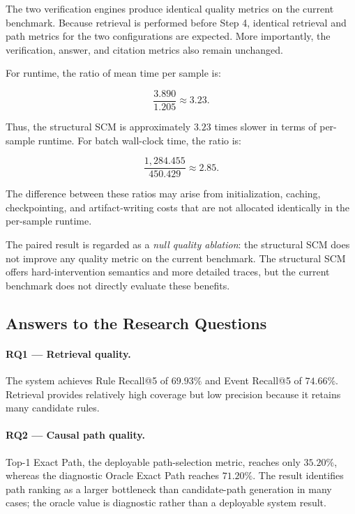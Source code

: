 The two verification engines produce identical quality metrics on the
current benchmark. Because retrieval is performed before Step 4, identical
retrieval and path metrics for the two configurations are expected. More
importantly, the verification, answer, and citation metrics also remain
unchanged.

For runtime, the ratio of mean time per sample is:

\begin{equation}
\frac{
    3.890
}{
    1.205
}
\approx
3.23.
\end{equation}

Thus, the structural SCM is approximately \(3.23\) times slower in terms of
per-sample runtime. For batch wall-clock time, the ratio is:

\begin{equation}
\frac{
    1{,}284.455
}{
    450.429
}
\approx
2.85.
\end{equation}

The difference between these ratios may arise from initialization, caching,
checkpointing, and artifact-writing costs that are not allocated identically
in the per-sample runtime.

The paired result is regarded as a \emph{null quality ablation}: the
structural SCM does not improve any quality metric on the current benchmark.
The structural SCM offers hard-intervention semantics and more detailed
traces, but the current benchmark does not directly evaluate these benefits.

\subsection{Answers to the Research Questions}

\paragraph{RQ1 --- Retrieval quality.}

The system achieves Rule Recall@5 of \(69.93\%\) and Event Recall@5 of
\(74.66\%\). Retrieval provides relatively high coverage but low precision
because it retains many candidate rules.

\paragraph{RQ2 --- Causal path quality.}

Top-1 Exact Path, the deployable path-selection metric, reaches only
\(35.20\%\), whereas the diagnostic Oracle Exact Path reaches \(71.20\%\).
The result identifies path ranking as a larger bottleneck than candidate-path
generation in many cases; the oracle value is diagnostic rather than a
deployable system result.

